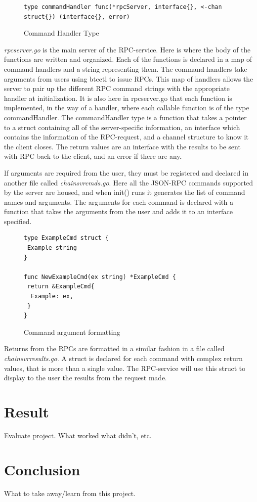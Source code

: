 \documentclass[11pt]{article}
\begin{document}
\begin{figure}[h!]
\begin{lstlisting}
type commandHandler func(*rpcServer, interface{}, <-chan struct{}) (interface{}, error)
\end{lstlisting}
\caption{Command Handler Type}
\label{fig:cmdHandler}
\end{figure}

{\it{rpcserver.go}} is the main server of the RPC-service. Here is where the body of the functions are written and organized. Each of the functions is declared in a map of command handlers and a string representing them. The command handlers take arguments from users using btcctl to issue RPCs. This map of handlers allows the server to pair up the different RPC command strings with the appropriate handler at initialization. It is also here in rpcserver.go that each function is implemented, in the way of a handler, where each callable function is of the type commandHandler. The commandHandler type is a function that takes a pointer to a struct containing all of the server-specific information, an interface which contains the information of the RPC-request, and a channel structure to know it the client closes. The return values are an interface with the results to be sent with RPC back to the client, and an error if there are any.

If arguments are required from the user, they must be registered and declared in another file called {\it{chainsvrcmds.go}}. Here all the JSON-RPC commands supported by the server are housed, and when init() runs it generates the list of command names and arguments. The arguments for each command is declared with a function that takes the arguments from the user and adds it to an interface specified. 

\begin{figure}[h!]
\begin{lstlisting}
type ExampleCmd struct {
 Example string
}

func NewExampleCmd(ex string) *ExampleCmd {
 return &ExampleCmd{
  Example: ex,
 }
}
\end{lstlisting}
\caption{Command argument formatting}
\label{fig:cmdArg}
\end{figure}

Returns from the RPCs are formatted in a similar fashion in a file called {\it{chainsvrresults.go}}. A struct is declared for each command with complex return values, that is more than a single value. The RPC-service will use this struct to display to the user the results from the request made. 


\section{Result}
Evaluate project. What worked what didn't, etc.

\section{Conclusion}
What to take away/learn from this project.

\newpage
 

\listoffigures
\end{document}
